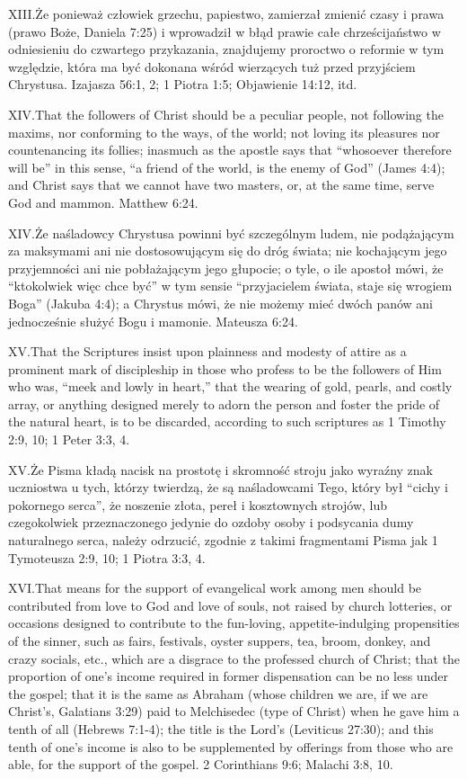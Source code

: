 \lettrine{XIII.} Że ponieważ człowiek grzechu, papiestwo, zamierzał zmienić czasy i prawa (prawo Boże, Daniela 7:25) i wprowadził w błąd prawie całe chrześcijaństwo w odniesieniu do czwartego przykazania, znajdujemy proroctwo o reformie w tym względzie, która ma być dokonana wśród wierzących tuż przed przyjściem Chrystusa. Izajasza 56:1, 2; 1 Piotra 1:5; Objawienie 14:12, itd.


\lettrine{XIV.} That the followers of Christ should be a peculiar people, not following the maxims, nor conforming to the ways, of the world; not loving its pleasures nor countenancing its follies; inasmuch as the apostle says that “whosoever therefore will be” in this sense, “a friend of the world, is the enemy of God” (James 4:4); and Christ says that we cannot have two masters, or, at the same time, serve God and mammon. Matthew 6:24.


\lettrine{XIV.} Że naśladowcy Chrystusa powinni być szczególnym ludem, nie podążającym za maksymami ani nie dostosowującym się do dróg świata; nie kochającym jego przyjemności ani nie pobłażającym jego głupocie; o tyle, o ile apostoł mówi, że “ktokolwiek więc chce być” w tym sensie “przyjacielem świata, staje się wrogiem Boga” (Jakuba 4:4); a Chrystus mówi, że nie możemy mieć dwóch panów ani jednocześnie służyć Bogu i mamonie. Mateusza 6:24.


\lettrine{XV.} That the Scriptures insist upon plainness and modesty of attire as a prominent mark of discipleship in those who profess to be the followers of Him who was, “meek and lowly in heart,” that the wearing of gold, pearls, and costly array, or anything designed merely to adorn the person and foster the pride of the natural heart, is to be discarded, according to such scriptures as 1 Timothy 2:9, 10; 1 Peter 3:3, 4.


\lettrine{XV.} Że Pisma kładą nacisk na prostotę i skromność stroju jako wyraźny znak uczniostwa u tych, którzy twierdzą, że są naśladowcami Tego, który był “cichy i pokornego serca”, że noszenie złota, pereł i kosztownych strojów, lub czegokolwiek przeznaczonego jedynie do ozdoby osoby i podsycania dumy naturalnego serca, należy odrzucić, zgodnie z takimi fragmentami Pisma jak 1 Tymoteusza 2:9, 10; 1 Piotra 3:3, 4.


\lettrine{XVI.} That means for the support of evangelical work among men should be contributed from love to God and love of souls, not raised by church lotteries, or occasions designed to contribute to the fun-loving, appetite-indulging propensities of the sinner, such as fairs, festivals, oyster suppers, tea, broom, donkey, and crazy socials, etc., which are a disgrace to the professed church of Christ; that the proportion of one’s income required in former dispensation can be no less under the gospel; that it is the same as Abraham (whose children we are, if we are Christ’s, Galatians 3:29) paid to Melchisedec (type of Christ) when he gave him a tenth of all (Hebrews 7:1-4); the title is the Lord’s (Leviticus 27:30); and this tenth of one’s income is also to be supplemented by offerings from those who are able, for the support of the gospel. 2 Corinthians 9:6; Malachi 3:8, 10.


